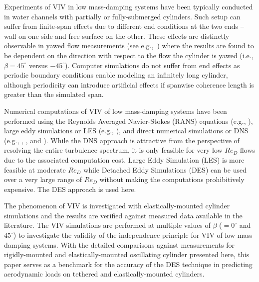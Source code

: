 Experiments of VIV in low mass-damping systems have been typically conducted in
water channels with partially or fully-submerged cylinders. Such setup can
suffer from finite-span effects due to different end conditions at the two ends
-- wall on one side and free surface on the other. These effects are distinctly
observable in yawed flow measurements (see e.g.,~\citet{franzini2013one}) where
the results are found to be dependent on the direction with respect to the flow
the cylinder is yawed (i.e., $\beta=45^\circ$ versus $-45^\circ$). Computer
simulations do not suffer from end effects as periodic boundary conditions
enable modeling an infinitely long cylinder, although periodicity can introduce
artificial effects if spanwise coherence length is greater than the simulated
span.

Numerical computations of VIV of low mass-damping systems have been performed
using the Reynolds Averaged Navier-Stokes (RANS) equations (e.g.,
\citet{guilmineau2004numerical}), large eddy simulations or LES (e.g.,
\citet{al2004vortex}), and direct numerical simulations or DNS (e.g.,
\citet{lucor2005vortex}, \citet{evangelinos2000dns}, and \citet{dong2005dns}).
While the DNS approach is attractive from the perspective of resolving the
entire turbulence spectrum, it is only feasible for very low $Re_D$ flows due
to the associated computation cost. Large Eddy Simulation (LES) is more
feasible at moderate $Re_D$ while Detached Eddy Simulations (DES) can be used
over a very large range of $Re_D$ without making the computations prohibitively
expensive. The DES approach is used here.

The phenomenon of VIV is investigated with elastically-mounted cylinder
simulations and the results are verified against measured data available in the
literature. The VIV simulations are performed at multiple values of $\beta$
($=0^\circ$ and $45^\circ$) to investigate the validity of the independence
principle for VIV of low mass-damping systems. With the detailed comparisons
against measurements for rigidly-mounted and elastically-mounted oscillating
cylinder presented here, this paper serves as a benchmark for the accuracy of
the DES technique in predicting aerodynamic loads on tethered and
elastically-mounted cylinders.
